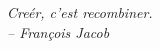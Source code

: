 {
\cleardoublepage
\setsinglecolumn
\vspace*{0.2\textheight}
\thispagestyle{empty}
\begin{flushright}\doublespacing\textit{
    {\LARGE Cre\'{e}r, c'est recombiner.}\\
    -- Fran\c{c}ois Jacob \citep{hsu2015pathogen}}
\end{flushright}
}
